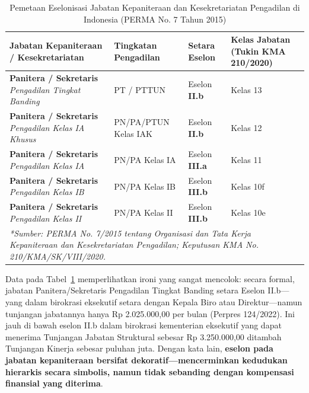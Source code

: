 \documentclass[12pt, a4paper]{article}
\begin{document}
\begin{table}[H]
\centering
\fontsize{9}{11}\selectfont
\caption{Pemetaan Eselonisasi Jabatan Kepaniteraan dan Kesekretariatan Pengadilan di Indonesia (PERMA No. 7 Tahun 2015)}
\label{tab:eselon-indonesia}
\renewcommand{\arraystretch}{1.35}
\begin{tabular}{p{4.8cm} p{2.8cm} p{2.8cm} p{2.8cm}}
\hline
\textbf{Jabatan Kepaniteraan / Kesekretariatan} & \textbf{Tingkatan Pengadilan} & \textbf{Setara Eselon} & \textbf{Kelas Jabatan (Tukin KMA 210/2020)} \tabularnewline
\hline
\raggedright\textbf{Panitera / Sekretaris} \newline \textit{Pengadilan Tingkat Banding} & PT / PTTUN & Eselon \textbf{II.b} & Kelas 13 \tabularnewline
\raggedright\textbf{Panitera / Sekretaris} \newline \textit{Pengadilan Kelas IA Khusus} & PN/PA/PTUN Kelas IAK & Eselon \textbf{II.b} & Kelas 12 \tabularnewline
\raggedright\textbf{Panitera / Sekretaris} \newline \textit{Pengadilan Kelas IA} & PN/PA Kelas IA & Eselon \textbf{III.a} & Kelas 11 \tabularnewline
\raggedright\textbf{Panitera / Sekretaris} \newline \textit{Pengadilan Kelas IB} & PN/PA Kelas IB & Eselon \textbf{III.b} & Kelas 10f \tabularnewline
\raggedright\textbf{Panitera / Sekretaris} \newline \textit{Pengadilan Kelas II} & PN/PA Kelas II & Eselon \textbf{III.b} & Kelas 10e \tabularnewline
\hline
\multicolumn{4}{p{15.4cm}}{\textit{*Sumber: PERMA No. 7/2015 tentang Organisasi dan Tata Kerja Kepaniteraan dan Kesekretariatan Pengadilan; Keputusan KMA No. 210/KMA/SK/VIII/2020.}} \tabularnewline
\hline
\end{tabular}
\end{table}

Data pada Tabel~\ref{tab:eselon-indonesia} memperlihatkan ironi yang sangat mencolok: secara formal, jabatan Panitera/Sekretaris Pengadilan Tingkat Banding setara Eselon II.b---yang dalam birokrasi eksekutif setara dengan Kepala Biro atau Direktur---namun tunjangan jabatannya hanya Rp 2.025.000,00 per bulan (Perpres 124/2022). Ini jauh di bawah eselon II.b dalam birokrasi kementerian eksekutif yang dapat menerima Tunjangan Jabatan Struktural sebesar Rp 3.250.000,00 ditambah Tunjangan Kinerja sebesar puluhan juta. Dengan kata lain, \textbf{eselon pada jabatan kepaniteraan bersifat dekoratif---mencerminkan kedudukan hierarkis secara simbolis, namun tidak sebanding dengan kompensasi finansial yang diterima}.
\end{document}
